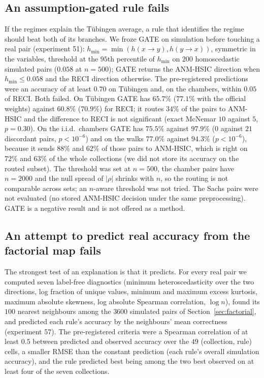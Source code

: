 \subsection{An assumption-gated rule fails}\label{sec:gate}
If the regimes explain the T\"ubingen average, a rule that identifies the regime should beat both of its branches. We froze GATE on simulation before touching a real pair (experiment 51): $h_{\min}=\min(h(x\to y),h(y\to x))$, symmetric in the variables, threshold at the $95$th percentile of $h_{\min}$ on $200$ homoscedastic simulated pairs ($0.058$ at $n=500$); GATE returns the ANM-HSIC direction when $h_{\min}\le 0.058$ and the RECI direction otherwise. The pre-registered predictions were an accuracy of at least $0.70$ on T\"ubingen and, on the chambers, within $0.05$ of RECI. Both failed. On T\"ubingen GATE has $65.7\%$ ($77.1\%$ with the official weights) against $60.8\%$ ($70.9\%$) for RECI; it routes $34\%$ of the pairs to ANM-HSIC and the difference to RECI is not significant (exact McNemar $10$ against $5$, $p=0.30$). On the i.i.d.\ chambers GATE has $75.5\%$ against $97.9\%$ ($0$ against $21$ discordant pairs, $p<10^{-6}$) and on the walks $77.0\%$ against $94.3\%$ ($p<10^{-6}$), because it sends $88\%$ and $62\%$ of those pairs to ANM-HSIC, which is right on $72\%$ and $63\%$ of the whole collections (we did not store its accuracy on the routed subset). The threshold was set at $n=500$, the chamber pairs have $n=2000$ and the null spread of $|\rho|$ shrinks with $n$, so the routing is not comparable across sets; an $n$-aware threshold was not tried. The Sachs pairs were not evaluated (no stored ANM-HSIC decision under the same preprocessing). GATE is a negative result and is not offered as a method.

\subsection{An attempt to predict real accuracy from the factorial map fails}\label{sec:predict}
The strongest test of an explanation is that it predicts. For every real pair we computed seven label-free diagnostics (minimum heteroscedasticity over the two directions, log fraction of unique values, minimum and maximum excess kurtosis, maximum absolute skewness, log absolute Spearman correlation, $\log n$), found its $100$ nearest neighbours among the $3600$ simulated pairs of Section~\ref{sec:factorial}, and predicted each rule's accuracy by the neighbours' mean correctness (experiment 57). The pre-registered criteria were a Spearman correlation of at least $0.5$ between predicted and observed accuracy over the $49$ (collection, rule) cells, a smaller RMSE than the constant prediction (each rule's overall simulation accuracy), and the rule predicted best being among the two best observed on at least four of the seven collections.

